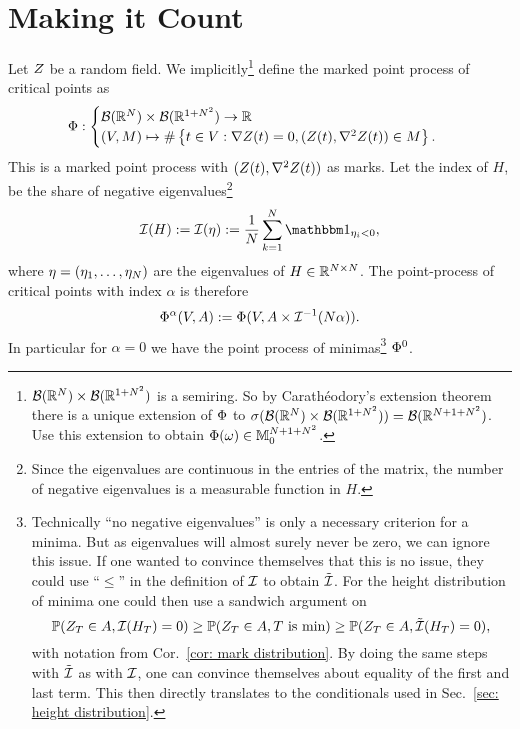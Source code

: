 \section{Making it Count}

\begin{definition}
	Let \(\rf\) be a random field. We implicitly\footnote{
		\(\borel(\real^\dims)\times\borel(\real^{1+\dims^2})\) is a semiring. So by
		Carathéodory's extension theorem there is a unique extension of
		\(\pp\) to
		\(\sigma(\borel(\real^\dims)\times\borel(\real^{1+\dims^2}))=\borel(\real^{\dims+1+\dims^2})\).
		Use this extension to obtain \(\pp(\omega)\in\locFiniteMeasure[\dims+1+\dims^2]\).
	} define the marked point process of critical points as
	\begin{align*}
		\pp:
		\begin{cases}
			\borel(\real^\dims)\times\borel(\real^{1+\dims^2}) \to \real\\
			(\Vol, M) \mapsto
			\#\left\{t\in\Vol:
				\nabla\rf(t)=0,
				(\rf(t), \nabla^2 \rf(t))\in M
			\right\}.
		\end{cases}
	\end{align*}
	This is a marked point process with \((\rf(t), \nabla^2\rf(t))\) as marks.
	Let the index of \(H\), be the share of negative eigenvalues\footnote{
		Since the eigenvalues are continuous in the entries of the matrix, the
		number of negative eigenvalues is a measurable function in \(H\).
	}
	\[
		\negEV(H) := \negEV(\evH) := \frac1\dims \sum_{k=1}^\dims \ind_{\evH_i < 0},
	\]
	where \(\evH=(\evH_1,\dots,\evH_\dims)\) are the eigenvalues of
	\(H\in\real^{\dims\times\dims}\).
	The point-process of critical points with index \(\alpha\) is therefore
	\[
		\pp^\alpha(\Vol, A)
		:= \pp(\Vol, A\times\negEV^{-1}(\dims\alpha)).
	\]
	In particular for \(\alpha=0\) we have the point process of minimas\footnote{
		Technically ``no negative eigenvalues'' is only a necessary criterion for a
		minima. But as eigenvalues will almost surely never be zero, we can
		ignore this issue. If one wanted to convince themselves that this is
		no issue, they could use ``\(\le\)'' in the definition of \(\negEV\) to
		obtain \(\tilde{\negEV}\). For the height distribution of minima one
		could then use a sandwich argument on
		\[
			\Pr(\rf_T\in A, \negEV(H_T) = 0)
			\ge \Pr(\rf_T\in A, T\text{ is min})
			\ge \Pr(\rf_T\in A, \tilde{\negEV}(H_T) = 0),
		\]
		with notation from Cor.~\ref{cor: mark distribution}.
		By doing the same steps with \(\tilde{\negEV}\) as with
		\(\negEV\), one can convince themselves about equality of the first and
		last term. This then directly translates to the conditionals used in
		Sec.~\ref{sec: height distribution}.
	} \(\pp^0\).
\end{definition}
